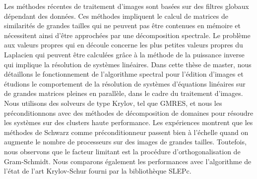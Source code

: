 Les méthodes récentes de traitement d'images sont basées sur des filtres globaux dépendant des données.
Ces méthodes impliquent le calcul de matrices de similarités de grandes tailles qui ne peuvent pas être contenues en mémoire et nécessitent ainsi d'être approchées par une décomposition spectrale.
Le problème aux valeurs propres qui en découle concerne les plus petites valeurs propres du Laplacien qui peuvent être calculées grâce à la méthode de la puissance inverse qui implique la résolution de systèmes linéaires.
Dans cette thèse de master, nous détaillons le fonctionnement de l'algorithme spectral pour l'édition d'images et étudions le comportement de la résolution de systèmes d'équations linéaires sur de grandes matrices pleines en parallèle, dans le cadre du traitement d'images.
Nous utilisons des solveurs de type Krylov, tel que GMRES, et nous les préconditionnons avec des méthodes de décomposition de domaines pour résoudre les systèmes sur des clusters haute performance.
Les expériences montrent que les méthodes de Schwarz comme préconditionneur passent bien à l'échelle quand on augmente le nombre de processeurs sur des images de grandes tailles.
Toutefois, nous observons que le facteur limitant est la procédure d'orthogonalisation de Gram-Schmidt.
\ifthesis
 Nous comparons également les performances avec l'algorithme de l'état de l'art Krylov-Schur fourni par la bibliothèque SLEPc.
\fi
